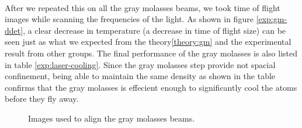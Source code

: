 \\
After we repeated this on all the gray molasses beams, we took time of flight images while scanning the frequencies of the light. As shown in figure \ref{exp:gm-ddet}, a clear decrease in temperature (a decrease in time of flight size) can be seen just as what we expected from the theory\ref{theory:gm} and the experimental result from other groups\cite{gm-theory}. The final performance of the gray molasses is also listed in table \ref{exp:laser-cooling}. Since the gray molasses step provide not spacial confinement, being able to maintain the same density as shown in the table confirms that the gray molasses is effecient enough to significantly cool the atoms before they fly away.
\begin{figure}
  \begin{center}
  \end{center}
  \caption{Images used to align the gray molasses beams.}
  \label{exp:gm-align}
\end{figure}
